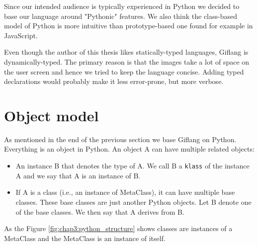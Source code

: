Since our intended audience is typically experienced in Python we decided to base our language around "Pythonic" features. We also think
the class-based model of Python is more intuitive than prototype-based one found for example in JavaScript.

Even though the author of this thesis likes statically-typed languages, Giflang is dynamically-typed. The primary reason is that the images take a lot of
space on the user screen and hence we tried to keep the language concise. Adding typed declarations would probably make it less error-prone, but more verbose.

\section{Object model}
As mentioned in the end of the previous section we base Giflang on Python. Everything is an object in Python. An object A can have multiple
related objects:
\begin{itemize}
    \item An instance B that denotes the type of A. We call B a \texttt{klass} of the instance A and we say that A is an instance of B.
    \item If A is a class (i.e., an instance of MetaClass), it can have multiple base classes. These base classes are just another Python objects. Let B denote
    one of the base classes. We then say that A derives from B. 
\end{itemize}

As the Figure \ref{fig:chap3:python_structure} shows classes are instances of a MetaClass and the MetaClass is an instance of itself.

